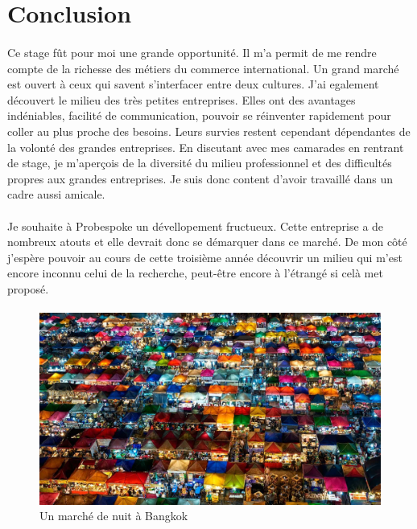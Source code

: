 \section*{Conclusion}
\paragraph{}
Ce stage fût pour moi une grande opportunité. Il m'a permit de me rendre compte de la richesse des métiers du commerce international. Un grand marché est ouvert à ceux qui savent s'interfacer entre deux cultures. J'ai egalement découvert le milieu des très petites entreprises. Elles ont des avantages indéniables, facilité de communication, pouvoir se réinventer rapidement pour coller au plus proche des besoins. Leurs survies restent cependant dépendantes de la volonté des grandes entreprises. En discutant avec mes camarades en rentrant de stage, je m'aperçois de la diversité du milieu professionnel et des difficultés propres aux grandes entreprises. Je suis donc content d'avoir travaillé dans un cadre aussi amicale.
 \paragraph{}
 Je souhaite à Probespoke un dévellopement fructueux. Cette entreprise a de nombreux atouts et elle devrait donc se démarquer dans ce marché. De mon côté j'espère pouvoir au cours de cette troisième année découvrir un milieu qui m'est encore inconnu celui de la recherche, peut-être encore à l'étrangé si celà met proposé.
 \paragraph{}
\begin{figure}[h]
\includegraphics[width=16cm]{image/marche.jpg}
\caption{Un marché de nuit à Bangkok}
\end{figure}
